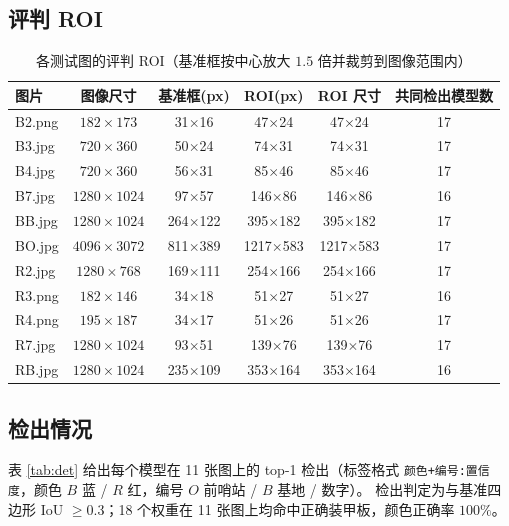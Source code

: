 \documentclass[11pt,a4paper]{ctexart}
\newcommand{\code}[1]{\texttt{\small #1}}
\begin{document}
\subsection{评判 ROI}
\begin{table}[htbp]
\centering\small
\caption{各测试图的评判 ROI（基准框按中心放大 $1.5$ 倍并裁剪到图像范围内）}\label{tab:roi}
\begin{tabular}{@{}lccccc@{}}
\toprule
图片 & 图像尺寸 & 基准框(px) & ROI(px) & ROI 尺寸 & 共同检出模型数\\
\midrule
B2.png & $182\times173$ & 31$\times$16 & 47$\times$24 & 47$\times$24 & 17\\
B3.jpg & $720\times360$ & 50$\times$24 & 74$\times$31 & 74$\times$31 & 17\\
B4.jpg & $720\times360$ & 56$\times$31 & 85$\times$46 & 85$\times$46 & 17\\
B7.jpg & $1280\times1024$ & 97$\times$57 & 146$\times$86 & 146$\times$86 & 16\\
BB.jpg & $1280\times1024$ & 264$\times$122 & 395$\times$182 & 395$\times$182 & 17\\
BO.jpg & $4096\times3072$ & 811$\times$389 & 1217$\times$583 & 1217$\times$583 & 17\\
R2.jpg & $1280\times768$ & 169$\times$111 & 254$\times$166 & 254$\times$166 & 17\\
R3.png & $182\times146$ & 34$\times$18 & 51$\times$27 & 51$\times$27 & 16\\
R4.png & $195\times187$ & 34$\times$17 & 51$\times$26 & 51$\times$26 & 17\\
R7.jpg & $1280\times1024$ & 93$\times$51 & 139$\times$76 & 139$\times$76 & 17\\
RB.jpg & $1280\times1024$ & 235$\times$109 & 353$\times$164 & 353$\times$164 & 16\\
\bottomrule
\end{tabular}
\end{table}

\subsection{检出情况}
表 \ref{tab:det} 给出每个模型在 11 张图上的 top-1 检出（标签格式 \code{颜色+编号:置信度}，颜色 $B$ 蓝 / $R$ 红，编号 $O$ 前哨站 / $B$ 基地 / 数字）。
检出判定为与基准四边形 IoU $\ge0.3$；18 个权重在 11 张图上均命中正确装甲板，颜色正确率 $100\%$。
\end{document}
